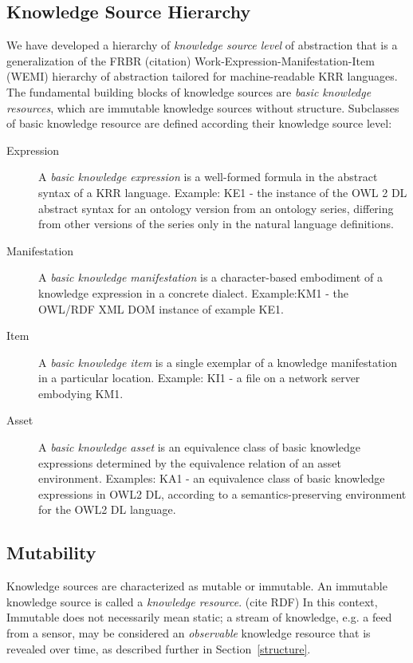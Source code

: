 \documentclass[runningheads]{llncs}
\begin{document}
\subsection{Knowledge Source Hierarchy}
We have developed a hierarchy of \emph{knowledge source level} of abstraction that is a generalization of the FRBR (citation) Work-Expression-Manifestation-Item (WEMI) hierarchy of abstraction tailored for machine-readable KRR languages. The fundamental building blocks of knowledge sources are \emph{basic knowledge resources}, which are immutable knowledge sources without structure.
Subclasses of basic knowledge resource are defined according their knowledge source level:
\begin{description}
\item[Expression] A \emph{basic knowledge expression} is a well-formed formula in the abstract syntax of a KRR language.
Example: KE1 - the instance of the OWL 2 DL abstract syntax for an ontology version from an ontology series, differing from other versions of the series only in the natural language definitions.
\item[Manifestation] A \emph{basic knowledge manifestation} is a character-based embodiment of a knowledge expression in a concrete dialect. Example:KM1 - the OWL/RDF XML DOM instance of example KE1.
\item[Item] A \emph{basic knowledge item} is a single exemplar of a knowledge manifestation in a particular location. Example: KI1 - a file on a network server embodying KM1.
\item[Asset] A \emph{basic knowledge asset} is an equivalence class of basic knowledge expressions determined by the equivalence relation of an asset environment. Examples: KA1 - an equivalence class of basic knowledge expressions in OWL2 DL, according to a semantics-preserving environment for the OWL2 DL language. 
\end{description}

\subsection{Mutability}
Knowledge sources are characterized as mutable or immutable. An immutable knowledge source is called a \emph{knowledge resource}. (cite RDF) In this context, Immutable does not necessarily mean static;  a stream of knowledge, e.g. a feed from a sensor, may be considered an \emph{observable} knowledge resource that is revealed over time, as described further in Section~\ref{structure}.
\end{document}
